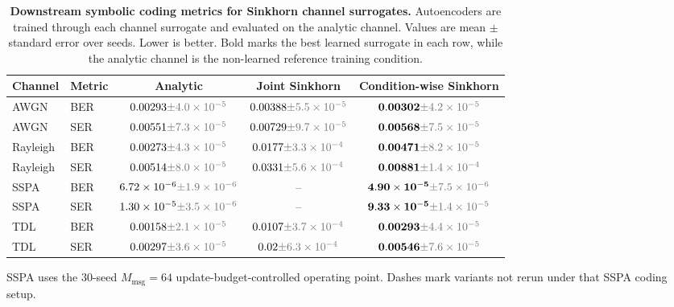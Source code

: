 \begin{table}[t]
\centering
\caption{\textbf{Downstream symbolic coding metrics for Sinkhorn channel surrogates.} Autoencoders are trained through each channel surrogate and evaluated on the analytic channel. Values are mean $\pm$ standard error over seeds. Lower is better. Bold marks the best learned surrogate in each row, while the analytic channel is the non-learned reference training condition.}
\label{tab:wflow-ser-ber}
\tablefontsize
\begin{tabular}{@{}llccc@{}}
\toprule
Channel & Metric & Analytic & Joint Sinkhorn & Condition-wise Sinkhorn \\
\midrule
AWGN & BER & $0.00293\err{4.0\times 10^{-5}}$ & $0.00388\err{5.5\times 10^{-5}}$ & $\mathbf{0.00302}\err{4.2\times 10^{-5}}$ \\
AWGN & SER & $0.00551\err{7.3\times 10^{-5}}$ & $0.00729\err{9.7\times 10^{-5}}$ & $\mathbf{0.00568}\err{7.5\times 10^{-5}}$ \\
\midrule
Rayleigh & BER & $0.00273\err{4.3\times 10^{-5}}$ & $0.0177\err{3.3\times 10^{-4}}$ & $\mathbf{0.00471}\err{8.2\times 10^{-5}}$ \\
Rayleigh & SER & $0.00514\err{8.0\times 10^{-5}}$ & $0.0331\err{5.6\times 10^{-4}}$ & $\mathbf{0.00881}\err{1.4\times 10^{-4}}$ \\
\midrule
SSPA & BER & $6.72\times 10^{-6}\err{1.9\times 10^{-6}}$ & -- & $\mathbf{4.90\times 10^{-5}}\err{7.5\times 10^{-6}}$ \\
SSPA & SER & $1.30\times 10^{-5}\err{3.5\times 10^{-6}}$ & -- & $\mathbf{9.33\times 10^{-5}}\err{1.4\times 10^{-5}}$ \\
\midrule
TDL & BER & $0.00158\err{2.1\times 10^{-5}}$ & $0.0107\err{3.7\times 10^{-4}}$ & $\mathbf{0.00293}\err{4.4\times 10^{-5}}$ \\
TDL & SER & $0.00297\err{3.6\times 10^{-5}}$ & $0.02\err{6.3\times 10^{-4}}$ & $\mathbf{0.00546}\err{7.6\times 10^{-5}}$ \\
\bottomrule
\end{tabular}
\par\vspace{0.25em}
\begin{minipage}{0.92\textwidth}
\footnotesize\raggedright
SSPA uses the \(30\)-seed \(M_{\mathrm{msg}}=64\) update-budget-controlled operating point. Dashes mark variants not rerun under that SSPA coding setup.
\end{minipage}
\end{table}
